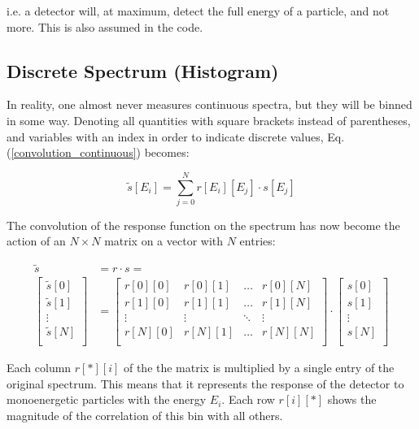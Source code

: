 \documentclass{article}
\begin{document}
\noindent i.e. a detector will, at maximum, detect the full energy of a particle, and not more. This is also assumed in the code.

\subsection{Discrete Spectrum (Histogram)}
In reality, one almost never measures continuous spectra, but they will be binned in some way.
Denoting all quantities with square brackets instead of parentheses, and variables with an index in order to indicate discrete values, Eq. (\ref{convolution_continuous}) becomes:

\begin{equation}
	\label{convolution_discrete}
	\tilde{s}[E_i] = \sum_{j = 0}^{N} r[E_i][E_j] \cdot s[E_j]
\end{equation}

\noindent The convolution of the response function on the spectrum has now become the action of an $N \times N$ matrix on a vector with $N$ entries:

\begin{align}
	\label{matrix_equation_general}
	\tilde{s} &= r \cdot s = \\
	\label{matrix_equation_explicit}
	\left[ 
		\begin{array}{c}
			\tilde{s}[0] \\
			\tilde{s}[1] \\
			\vdots	\\
			\tilde{s}[N] \\
		\end{array}
	\right]
	&= 
	\begin{bmatrix}
		r[0][0] & r[0][1] & \hdots & r[0][N] \\
		r[1][0] & r[1][1] & \hdots & r[1][N] \\
		\vdots  & \vdots  & \ddots & \vdots  \\
		r[N][0] & r[N][1] & \hdots & r[N][N] \\
	\end{bmatrix}
	\cdot
	\left[ 
		\begin{array}{c}
			s[0] \\
			s[1] \\
			\vdots	\\
			s[N] \\
		\end{array}
	\right]
\end{align}

\noindent Each column $r[*][i]$ of the the matrix is multiplied by a single entry of the original spectrum. This means that it represents the response of the detector to monoenergetic particles with the energy $E_i$.
Each row $r[i][*]$ shows the magnitude of the correlation of this bin with all others.
\end{document}
